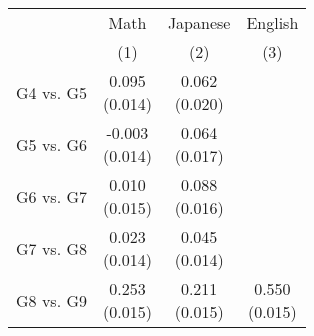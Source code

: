 \begin{tabular}{lccc}
\hline \hline
 & Math & Japanese & English \\
 & (1) & (2) & (3) \\
\hline \hline
G4 vs. G5 & \shortstack{0.095\\(0.014)} & \shortstack{0.062\\(0.020)} &  \\
G5 vs. G6 & \shortstack{-0.003\\(0.014)} & \shortstack{0.064\\(0.017)} &  \\
G6 vs. G7 & \shortstack{0.010\\(0.015)} & \shortstack{0.088\\(0.016)} &  \\
G7 vs. G8 & \shortstack{0.023\\(0.014)} & \shortstack{0.045\\(0.014)} &  \\
G8 vs. G9 & \shortstack{0.253\\(0.015)} & \shortstack{0.211\\(0.015)} & \shortstack{0.550\\(0.015)} \\
\hline \hline
\end{tabular}
